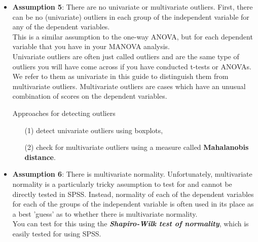 \documentclass[a4paper,12pt]{article}
\begin{document}
\begin{itemize}
	\item \textbf{Assumption 5}: There are no univariate or multivariate outliers. First, there can be no (univariate) outliers in each group of the independent variable for any of the dependent variables.\\ This is a similar assumption to the one-way ANOVA, but for each dependent variable that you have in your MANOVA analysis. \\ Univariate outliers are often just called outliers and are the same type of outliers you will have come across if you have conducted t-tests or ANOVAs.\\ We refer to them as univariate in this guide to distinguish them from multivariate outliers. Multivariate outliers are cases which have an unusual combination of scores on the dependent variables.	
	\begin{framed}
Approaches for detecting outliers
\begin{itemize}
\item[(1)] detect univariate outliers using boxplots,  
\item[(2)] check for multivariate outliers using a measure called \textbf{Mahalanobis distance}.
\end{itemize} 
	\end{framed}
	\bigskip
	\item \textbf{Assumption 6}: There is multivariate normality. Unfortunately, multivariate normality is a particularly tricky assumption to test for and cannot be directly tested in SPSS. Instead, normality of each of the dependent variables for each of the groups of the independent variable is often used in its place as a best 'guess' as to whether there is multivariate normality.\\ You can test for this using the \textbf{\textit{Shapiro-Wilk test of normality}}, which is easily tested for using SPSS. \\
	

\end{itemize}
\end{document}
